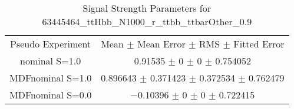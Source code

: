 \begin{table}
\centering
\caption{Signal Strength Parameters for 63445464\_ttHbb\_N1000\_r\_ttbb\_ttbarOther\_0.9}
\begin{tabular}{cc}
\toprule
Pseudo Experiment & Mean $\pm$ Mean Error $\pm$ RMS $\pm$ Fitted Error\\
nominal S=1.0 & \num{0.91535} $\pm$ \num{0} $\pm$ \num{0} $\pm$ \num{0.754052}\\
MDFnominal S=1.0 & \num{0.896643} $\pm$ \num{0.371423} $\pm$ \num{0.372534} $\pm$ \num{0.762479}\\
MDFnominal S=0.0 & \num{-0.10396} $\pm$ \num{0} $\pm$ \num{0} $\pm$ \num{0.722415}\\
\bottomrule
\end{tabular}
\end{table}
